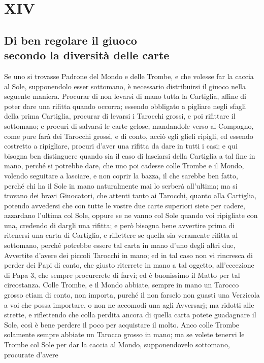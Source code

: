 \documentclass[11pt,a6paper]{article}
\begin{document}
\section{XIV}
\subsection*{Di ben regolare il giuoco\\ secondo la diversità delle carte}

Se uno si trovasse Padrone del Mondo 
e delle Trombe, e che volesse far
la caccia al Sole, supponendolo esser sottomano, è necessario distribuirsi il giuoco
nella seguente maniera. Procurar di non levarsi di mano tutta la Cartiglia, affine di poter dare una rifitta quando occorra; essendo obbligato a pigliare negli sfagli della prima Cartiglia, procurar di levarsi i Tarocchi grossi, e poi rifittare il sottomano; e procuri di salvarsi le carte gelose, mandandole verso al Compagno, come pure farà dei Tarocchi grossi, e di conto, acciò egli glieli ripigli, ed essendo costretto a ripigliare, procuri d'aver una rifitta da dare in tutti i casi; e qui bisogna ben distinguere quando sia il caso di lasciarsi della Cartiglia a tal fine in mano, perché si potrebbe dare, che uno poi cadesse colle Trombe e il Mondo, volendo seguitare a lasciare, e non coprir la bazza, il che sarebbe ben fatto, perché chi ha il Sole in mano naturalmente mai lo serberà all'ultima; ma si trovano dei bravi Giuocatori, che attenti tanto ai Tarocchi, quanto alla Cartiglia, potendo avvedersi che con tutte le vostre due carte superiori siete per cadere, azzardano l'ultima col Sole, oppure se ne vanno col Sole quando voi ripigliate con
una, credendo di dargli una rifitta; e però bisogna bene avvertire prima di ritenersi una carta di Cartiglia, e riflettere se quella sia veramente rifitta al sottomano, perché potrebbe essere tal carta in mano d'uno degli altri due, Avvertite d'avere dei piccoli Tarocchi in mano; ed in tal caso non vi rincresca di perder dei Papi di conto, che giusto riterrete in mano a tal oggetto, all'eccezione di Papa 3, che sempre procurerete di farvi; ed è buonissimo il Matto per tal circostanza. Colle Trombe, e il Mondo abbiate, sempre in mano un Tarocco grosso etiam di conto, non importa, purché il non farselo non guasti una Verzicola a voi che possa importare, o non ne accomodi una agli Avversarj; ma ridotti alle strette, e riflettendo che colla perdita ancora di quella carta potete guadagnare il Sole, così è bene perdere il poco per acquistare il molto. Anco colle Trombe solamente sempre abbiate un Tarocco grosso in mano; ma se volete tenervi le Trombe col Sole per dar la caccia al Mondo, supponendovelo sottomano, procurate d'avere
\end{document}
